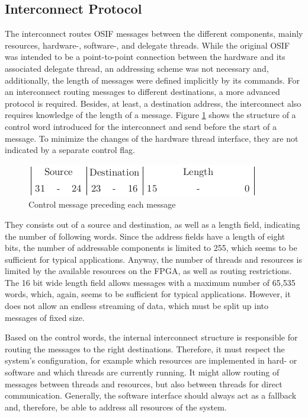 \subsection{Interconnect Protocol}
The interconnect routes \ac{OSIF} messages between the different components,
mainly resources, hardware-, software-, and delegate threads. While the
original \ac{OSIF} was intended to be a point-to-point connection between the
hardware and its associated delegate thread, an addressing scheme was not
necessary and, additionally, the length of messages were defined implicitly by
its commands. For an interconnect routing messages to different destinations,
a more advanced protocol is required. Besides, at least, a destination
address, the interconnect also requires knowledge of the length of a message.
Figure \ref{fig:proto} shows the structure of a control word introduced for
the interconnect and send before the start of a message. To minimize the
changes of the hardware thread interface, they are not indicated by a separate
control flag.
\begin{figure}[tb]
	\centering
	\includegraphics{../figures/proto}
	\caption{Control message preceding each message}
	\label{fig:proto}
\end{figure}
They consists out of a source and destination, as well as a length field,
indicating the number of following words. Since the address fields have a
length of eight bits, the number of addressable components is limited to 255,
which seems to be sufficient for typical applications. Anyway, the number of
threads and resources is limited by the available resources on the
\ac{FPGA}, as well as routing restrictions. The 16 bit wide length field
allows messages with a maximum number of 65,535 words, which, again, seems to
be sufficient for typical applications. However, it does not allow an endless
streaming of data, which must be split up into messages of fixed size.

Based on the control words, the internal interconnect structure is responsible
for routing the messages to the right destinations. Therefore, it must respect
the system's configuration, for example which resources are implemented in
hard- or software and which threads are currently running. It might allow
routing of messages between threads and resources, but also between threads
for direct communication. Generally, the software interface should always act
as a fallback and, therefore, be able to address all resources of the system.

